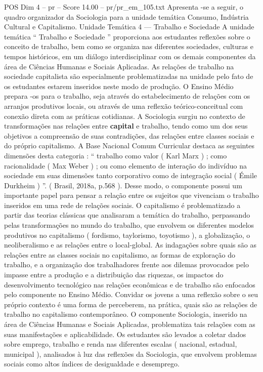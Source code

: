 \begin{textsample}{POS Dim 4 – pr – Score 14.00 – pr/pr\_em\_105.txt}
Apresenta -se a seguir, o quadro organizador da Sociologia para a unidade temática Consumo, Indústria Cultural e Capitalismo.
Unidade Temática 4 — Trabalho e Sociedade A unidade temática “ Trabalho e Sociedade ” proporciona aos estudantes reflexões sobre o conceito de trabalho, bem como se organiza nas diferentes sociedades, culturas e tempos históricos, em um diálogo interdisciplinar com os demais componentes da área de Ciências Humanas e Sociais Aplicadas.
As relações de trabalho na sociedade capitalista são especialmente problematizadas na unidade pelo fato de os estudantes estarem inseridos neste modo de produção.
O Ensino Médio prepara -os para o trabalho, seja através do estabelecimento de relações com os arranjos produtivos locais, ou através de uma reflexão teórico-conceitual com conexão direta com as práticas cotidianas.
A Sociologia surgiu no contexto de transformações nas relações entre \textbf{capital} e trabalho, tendo como um dos seus objetivos a compreensão de suas contradições, das relações entre classes sociais e do próprio capitalismo.
A Base Nacional Comum Curricular destaca as seguintes dimensões desta categoria : “ trabalho como valor ( Karl Marx ) ; como racionalidade ( Max Weber ) ; ou como elemento de interação do indivíduo na sociedade em suas dimensões tanto corporativo como de integração social ( Émile Durkheim ) ”. ( Brasil, 2018a, p.568 ).
Desse modo, o componente possui um importante papel para pensar a relação entre os sujeitos que vivenciam o trabalho inseridos em uma rede de relações sociais.
O capitalismo é problematizado a partir das teorias clássicas que analisaram a temática do trabalho, perpassando pelas transformações no mundo do trabalho, que envolvem os diferentes modelos produtivos no capitalismo ( fordismo, taylorismo, toyotismo ), a globalização, o neoliberalismo e as relações entre o local-global.
As indagações sobre quais são as relações entre as classes sociais no capitalismo, as formas de exploração do trabalho, e a organização dos trabalhadores frente aos dilemas provocados pelo impasse entre a produção e a distribuição das riquezas, os impactos do desenvolvimento tecnológico nas relações econômicas e de trabalho são enfocados pelo componente no Ensino Médio.
Convidar os jovens a uma reflexão sobre o seu próprio contexto é uma forma de perceberem, na prática, quais são as relações de trabalho no capitalismo contemporâneo.
O componente Sociologia, inserido na área de Ciências Humanas e Sociais Aplicadas, problematiza tais relações com as suas manifestações e aplicabilidade.
Os estudantes são levados a coletar dados sobre emprego, trabalho e renda nas diferentes escalas ( nacional, estadual, municipal ), analisados à luz das reflexões da Sociologia, que envolvem problemas sociais como altos índices de desigualdade e desemprego.

\end{textsample}
